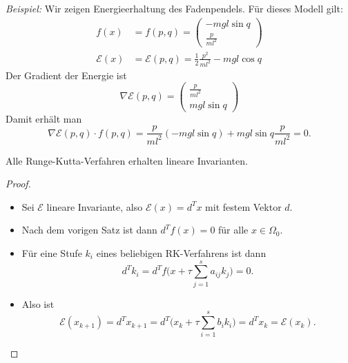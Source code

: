 \bigskip

\emph{Beispiel:} Wir zeigen Energieerhaltung des Fadenpendels.
Für dieses Modell gilt:
\begin{align*}
 f(x) & = f(p,q)
  =
  \begin{pmatrix}
   - mgl \sin q \\ \frac{p}{ml^2}
  \end{pmatrix} \\
 \mathcal{E}(x) & = \mathcal{E}(p,q)
  =
  \frac{1}{2} \frac{p^2}{ml^2} - mgl \cos q
\end{align*}
Der Gradient der Energie ist
\begin{equation*}
 \nabla \mathcal{E}(p,q)
 =
 \begin{pmatrix}
  \frac{p}{ml^2} \\ mgl \sin q
 \end{pmatrix}
\end{equation*}
Damit erhält man
\begin{equation*}
 \nabla \mathcal{E}(p,q) \cdot f(p,q)
 =
 \frac{p}{ml^2}(- mgl \sin q) + mgl \sin q\frac{p}{ml^2}
 =
 0.
\end{equation*}



\bigskip

\begin{satz}
	Alle Runge-Kutta-Verfahren erhalten lineare Invarianten.
\end{satz}
\begin{proof}\mbox{}
	\begin{itemize}
		\item Sei $\mathcal{E}$ lineare Invariante, also $\mathcal{E}(x) = d^Tx$ mit festem Vektor $d$.
		\item Nach dem vorigen Satz ist dann $d^T f(x) = 0$ für alle $x\in\Omega_0$.
		\item Für eine Stufe $k_i$ eines beliebigen RK-Verfahrens ist dann
		\begin{equation*}
			d^T k_i = d^T f\Big( x+\tau\sum_{j=1}^s a_{ij}k_j \Big) = 0.
		\end{equation*}
		\item Also ist
		\begin{equation*}
			\mathcal E(x_{k+1})
			=
			d^T x_{k+1}
			=
			d^T\Big(x_k+\tau\sum_{i=1}^s b_{i}k_i\Big)
			=
			d^T x_k
			=
			\mathcal{E}(x_k).   
		\end{equation*}
		\end{itemize}
\end{proof}

